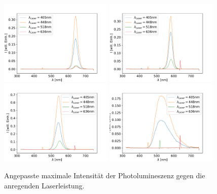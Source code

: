 \begin{figure}[h]
  \centering
  \includegraphics[width = 0.48\textwidth]{Probe_1_lambda.pdf}
  \includegraphics[width = 0.48\textwidth]{Probe_2_lambda.pdf}
  \includegraphics[width = 0.48\textwidth]{Probe_3_lambda.pdf}
  \includegraphics[width = 0.48\textwidth]{Probe_4_lambda.pdf}
  \label{fig:PLvsLambda}
  \caption{Angepasste maximale Intensität der Photolumineszenz gegen die anregenden Laserleistung.}
\end{figure}

\FloatBarrier

